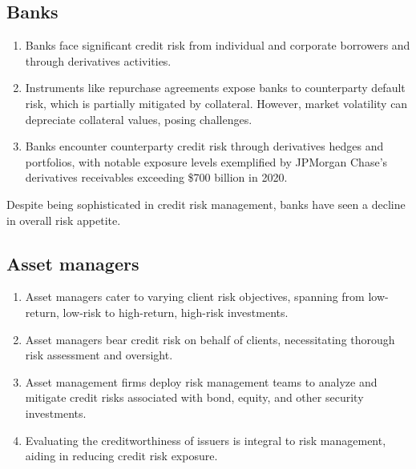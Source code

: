 \subsection*{Banks}
\begin{enumerate}
\item {} Banks face significant credit risk from
individual and corporate borrowers and through derivatives activities.
\item {} Instruments like repurchase agreements
expose banks to counterparty default risk, which is partially mitigated by
collateral. However, market volatility can depreciate collateral values, posing
challenges.
\item {} Banks encounter counterparty credit risk
through derivatives hedges and portfolios, with notable exposure levels
exemplified by JPMorgan Chase's derivatives receivables exceeding \$700 billion
in 2020.
\end{enumerate}
Despite being sophisticated in credit risk management, banks have seen a decline
in overall risk appetite.

\subsection*{Asset managers}
\begin{enumerate}
\item {} Asset managers cater to varying client risk
objectives, spanning from low-return, low-risk to high-return, high-risk
investments.
\item {} Asset managers bear credit risk on behalf of
clients, necessitating thorough risk assessment and oversight.
\item {} Asset management firms deploy risk
management teams to analyze and mitigate credit risks associated with bond,
equity, and other security investments.
\item {} Evaluating the creditworthiness of
issuers is integral to risk management, aiding in reducing credit risk exposure.
\end{enumerate}

